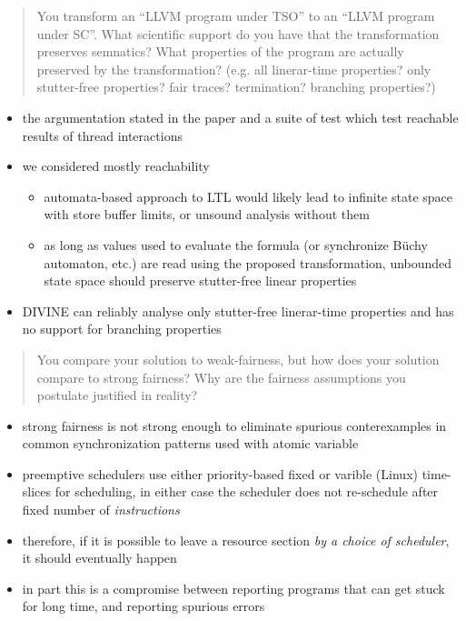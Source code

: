 \documentclass[aspectratio=169, fi]{paradise-slide}
\newcommand{\rquote}[1]{\begin{quote}#1\end{quote}\bigskip\setlength{\leftmargini}{1em}}
\begin{document}
\begin{frame}[noframenumbering]{\qtitle}
  \rquote{You transform an ``LLVM program under TSO'' to an ``LLVM program under SC''. What
  scientific support do you have that the transformation preserves semnatics? What properties of the
  program are actually preserved by the transformation? (e.g. all linerar-time properties? only
  stutter-free properties? fair traces? termination? branching properties?)}
  \begin{itemize}
    \item the argumentation stated in the paper and a suite of test which test reachable results of
      thread interactions \pause
    \item we considered mostly reachability
      \begin{itemize}
        \item automata-based approach to LTL would likely lead to infinite state space with store
          buffer limits, or unsound analysis without them
        \item as long as values used to evaluate the formula (or synchronize Büchy automaton, etc.)
          are read using the proposed transformation, unbounded state space should preserve
          stutter-free linear properties
      \end{itemize} \pause
    \item DIVINE can reliably analyse only stutter-free linerar-time properties and has no support
      for branching properties
  \end{itemize}
\end{frame}

\begin{frame}[noframenumbering]{\qtitle}
  \rquote{You compare your solution to weak-fairness, but how does your solution compare to strong
    fairness? Why are the fairness assumptions you postulate justified in reality?}
  \begin{itemize}
    \item strong fairness is not strong enough to eliminate spurious conterexamples in common
      synchronization patterns used with atomic variable
    \item preemptive schedulers use either priority-based fixed or varible (Linux) time-slices for
      scheduling, in either case the scheduler does not re-schedule after fixed number of
      \emph{instructions}
    \item therefore, if it is possible to leave a resource section \emph{by a choice of scheduler},
      it should eventually happen
    \item in part this is a compromise between reporting programs that can get stuck for long time,
      and reporting spurious errors
  \end{itemize}
\end{frame}
\end{document}
